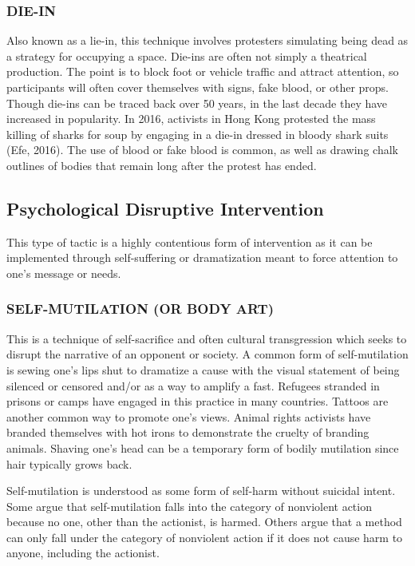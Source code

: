 \documentclass[twoside,a4paper,12pt,fleqn,openany]{extbook}
\begin{document}
\subsubsection*{DIE-IN}

Also known as a lie-in, this technique involves protesters simulating being dead as a strategy for occupying a space. Die-ins are often not simply a theatrical production. The point is to block foot or vehicle traffic and attract attention, so participants will often cover themselves with signs, fake blood, or other props. Though die-ins can be traced back over 50 years, in the last decade they have increased in popularity. In 2016, activists in Hong Kong protested the mass killing of sharks for soup by engaging in a die-in dressed in bloody shark suits (Efe, 2016). The use of blood or fake blood is common, as well as drawing chalk outlines of bodies that remain long after the protest has ended.

\subsection*{Psychological Disruptive Intervention}

This type of tactic is a highly contentious form of intervention as it can be implemented through self-suffering or dramatization meant to force attention to one’s message or needs.

\subsubsection*{SELF-MUTILATION (OR BODY ART)}

This is a technique of self-sacrifice and often cultural transgression which seeks to disrupt the narrative of an opponent or society. A common form of self-mutilation is sewing one’s lips shut to dramatize a cause with the visual statement of being silenced or censored and/or as a way to amplify a fast. Refugees stranded in prisons or camps have engaged in this practice in many countries. Tattoos are another common way to promote one’s views. Animal rights activists have branded themselves with hot irons to demonstrate the cruelty of branding animals. Shaving one’s head can be a temporary form of bodily mutilation since hair typically grows back.

Self-mutilation is understood as some form of self-harm without suicidal intent. Some argue that self-mutilation falls into the category of nonviolent action because no one, other than the actionist, is harmed. Others argue that a method can only fall under the category of nonviolent action if it does not cause harm to anyone, including the actionist.
\end{document}
